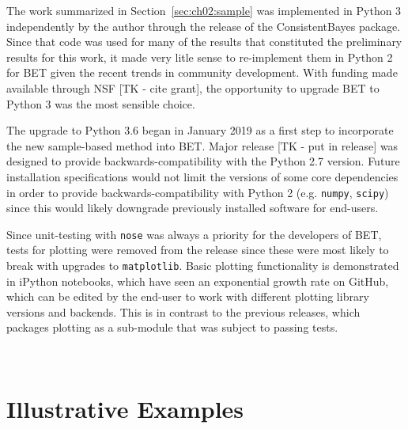 The work summarized in Section~\ref{sec:ch02:sample} was implemented in Python 3 independently by the author through the release of the ConsistentBayes package.
Since that code was used for many of the results that constituted the preliminary results for this work, it made very litle sense to re-implement them in Python 2 for BET given the recent trends in community development. 
With funding made available through NSF [TK - cite grant], the opportunity to upgrade BET to Python 3 was the most sensible choice. 

The upgrade to Python 3.6 began in January 2019 as a first step to incorporate the new sample-based method into BET.
Major release [TK - put in release] was designed to provide backwards-compatibility with the Python 2.7 version. 
Future installation specifications would not limit the versions of some core dependencies in order to provide backwards-compatibility with Python 2 (e.g. {\tt numpy}, {\tt scipy}) since this would likely downgrade previously installed software for end-users. 

Since unit-testing with {\tt nose} was always a priority for the developers of BET, tests for plotting were removed from the release since these were most likely to break with upgrades to {\tt matplotlib}.
Basic plotting functionality is demonstrated in iPython notebooks, which have seen an exponential growth rate on GitHub, which can be edited by the end-user to work with different plotting library versions and backends.
This is in contrast to the previous releases, which packages plotting as a sub-module that was subject to passing tests.   




\
\section{Illustrative Examples}


